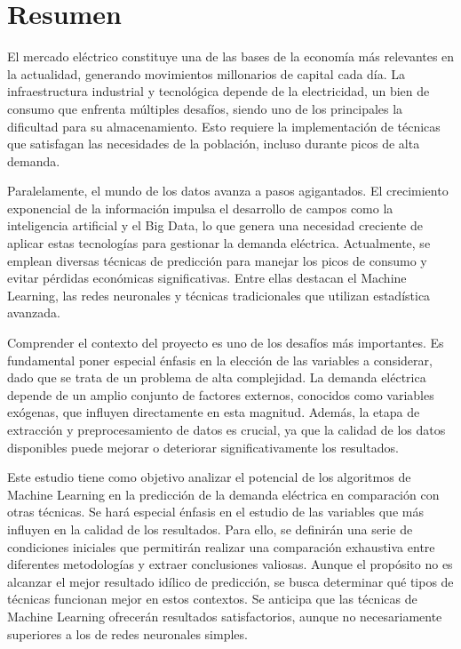 \documentclass[12pt,a4paper]{report}
\begin{document}
\chapter*{Resumen} 

El mercado eléctrico constituye una de las bases de la economía más relevantes en la actualidad, generando movimientos millonarios de capital cada día. La infraestructura industrial y tecnológica depende de la electricidad, un bien de consumo que enfrenta múltiples desafíos, siendo uno de los principales la dificultad para su almacenamiento. Esto requiere la implementación de técnicas que satisfagan las necesidades de la población, incluso durante picos de alta demanda.

Paralelamente, el mundo de los datos avanza a pasos agigantados. El crecimiento exponencial de la información impulsa el desarrollo de campos como la inteligencia artificial y el Big Data, lo que genera una necesidad creciente de aplicar estas tecnologías para gestionar la demanda eléctrica. Actualmente, se emplean diversas técnicas de predicción para manejar los picos de consumo y evitar pérdidas económicas significativas. Entre ellas destacan el Machine Learning, las redes neuronales y técnicas tradicionales que utilizan estadística avanzada.

Comprender el contexto del proyecto es uno de los desafíos más importantes. Es fundamental poner especial énfasis en la elección de las variables a considerar, dado que se trata de un problema de alta complejidad. La demanda eléctrica depende de un amplio conjunto de factores externos, conocidos como variables exógenas, que influyen directamente en esta magnitud. Además, la etapa de extracción y preprocesamiento de datos es crucial, ya que la calidad de los datos disponibles puede mejorar o deteriorar significativamente los resultados.

Este estudio tiene como objetivo analizar el potencial de los algoritmos de Machine Learning en la predicción de la demanda eléctrica en comparación con otras técnicas. Se hará especial énfasis en el estudio de las variables que más influyen en la calidad de los resultados. Para ello, se definirán una serie de condiciones iniciales que permitirán realizar una comparación exhaustiva entre diferentes metodologías y extraer conclusiones valiosas. Aunque el propósito no es alcanzar el mejor resultado idílico de predicción, se busca determinar qué tipos de técnicas funcionan mejor en estos contextos. Se anticipa que las técnicas de Machine Learning ofrecerán resultados satisfactorios, aunque no necesariamente superiores a los de redes neuronales simples.
\end{document}
